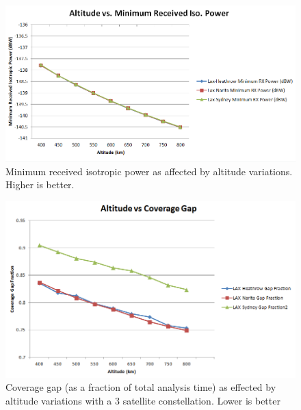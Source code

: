 \begin{figure}[htbp]
	\centering
	\includegraphics[scale = 0.6]{Pictures/AltitudeVsRxPower12sat.png}
	
	\caption{Minimum received isotropic power as affected by altitude variations. Higher is better.}
	\label{fig:AltitudeVsRxPower12sat}
\end{figure}


\begin{figure}[htbp]
	\centering
	\includegraphics[scale = 0.6]{Pictures/AltitudeVsCovGap3sat.png}
	
	\caption{Coverage gap (as a fraction of total analysis time) as effected by altitude variations with a 3 satellite constellation. Lower is better}
	\label{fig:AltitudeVsCovGap3sat}
\end{figure} 


